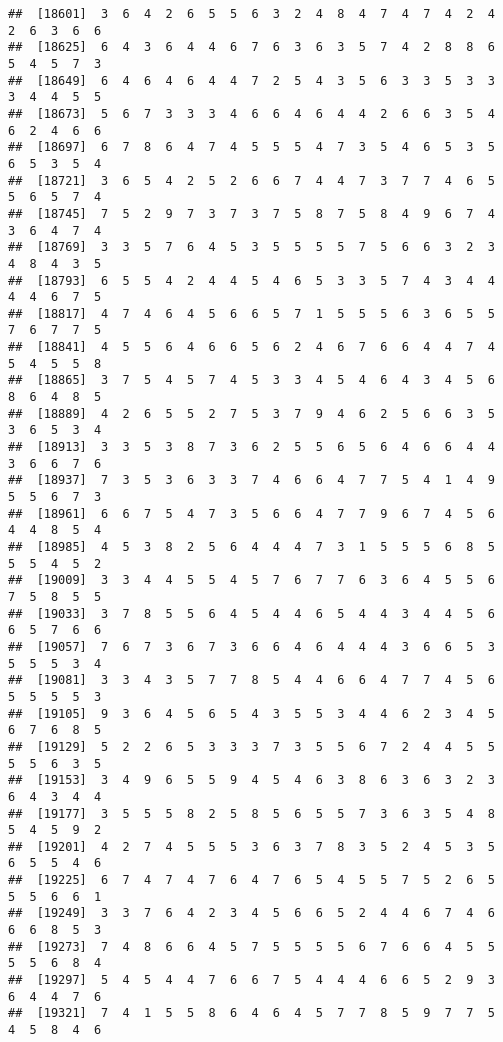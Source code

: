 \documentclass[
]{book}
\begin{document}
\begin{verbatim}
##  [18601]  3  6  4  2  6  5  5  6  3  2  4  8  4  7  4  7  4  2  4  2  6  3  6  6
##  [18625]  6  4  3  6  4  4  6  7  6  3  6  3  5  7  4  2  8  8  6  5  4  5  7  3
##  [18649]  6  4  6  4  6  4  4  7  2  5  4  3  5  6  3  3  5  3  3  3  4  4  5  5
##  [18673]  5  6  7  3  3  3  4  6  6  4  6  4  4  2  6  6  3  5  4  6  2  4  6  6
##  [18697]  6  7  8  6  4  7  4  5  5  5  4  7  3  5  4  6  5  3  5  6  5  3  5  4
##  [18721]  3  6  5  4  2  5  2  6  6  7  4  4  7  3  7  7  4  6  5  5  6  5  7  4
##  [18745]  7  5  2  9  7  3  7  3  7  5  8  7  5  8  4  9  6  7  4  3  6  4  7  4
##  [18769]  3  3  5  7  6  4  5  3  5  5  5  5  7  5  6  6  3  2  3  4  8  4  3  5
##  [18793]  6  5  5  4  2  4  4  5  4  6  5  3  3  5  7  4  3  4  4  4  4  6  7  5
##  [18817]  4  7  4  6  4  5  6  6  5  7  1  5  5  5  6  3  6  5  5  7  6  7  7  5
##  [18841]  4  5  5  6  4  6  6  5  6  2  4  6  7  6  6  4  4  7  4  5  4  5  5  8
##  [18865]  3  7  5  4  5  7  4  5  3  3  4  5  4  6  4  3  4  5  6  8  6  4  8  5
##  [18889]  4  2  6  5  5  2  7  5  3  7  9  4  6  2  5  6  6  3  5  3  6  5  3  4
##  [18913]  3  3  5  3  8  7  3  6  2  5  5  6  5  6  4  6  6  4  4  3  6  6  7  6
##  [18937]  7  3  5  3  6  3  3  7  4  6  6  4  7  7  5  4  1  4  9  5  5  6  7  3
##  [18961]  6  6  7  5  4  7  3  5  6  6  4  7  7  9  6  7  4  5  6  4  4  8  5  4
##  [18985]  4  5  3  8  2  5  6  4  4  4  7  3  1  5  5  5  6  8  5  5  5  4  5  2
##  [19009]  3  3  4  4  5  5  4  5  7  6  7  7  6  3  6  4  5  5  6  7  5  8  5  5
##  [19033]  3  7  8  5  5  6  4  5  4  4  6  5  4  4  3  4  4  5  6  6  5  7  6  6
##  [19057]  7  6  7  3  6  7  3  6  6  4  6  4  4  4  3  6  6  5  3  5  5  5  3  4
##  [19081]  3  3  4  3  5  7  7  8  5  4  4  6  6  4  7  7  4  5  6  5  5  5  5  3
##  [19105]  9  3  6  4  5  6  5  4  3  5  5  3  4  4  6  2  3  4  5  6  7  6  8  5
##  [19129]  5  2  2  6  5  3  3  3  7  3  5  5  6  7  2  4  4  5  5  5  5  6  3  5
##  [19153]  3  4  9  6  5  5  9  4  5  4  6  3  8  6  3  6  3  2  3  6  4  3  4  4
##  [19177]  3  5  5  5  8  2  5  8  5  6  5  5  7  3  6  3  5  4  8  5  4  5  9  2
##  [19201]  4  2  7  4  5  5  5  3  6  3  7  8  3  5  2  4  5  3  5  6  5  5  4  6
##  [19225]  6  7  4  7  4  7  6  4  7  6  5  4  5  5  7  5  2  6  5  5  5  6  6  1
##  [19249]  3  3  7  6  4  2  3  4  5  6  6  5  2  4  4  6  7  4  6  6  6  8  5  3
##  [19273]  7  4  8  6  6  4  5  7  5  5  5  5  6  7  6  6  4  5  5  5  5  6  8  4
##  [19297]  5  4  5  4  4  7  6  6  7  5  4  4  4  6  6  5  2  9  3  6  4  4  7  6
##  [19321]  7  4  1  5  5  8  6  4  6  4  5  7  7  8  5  9  7  7  5  4  5  8  4  6

\end{verbatim}
\end{document}
